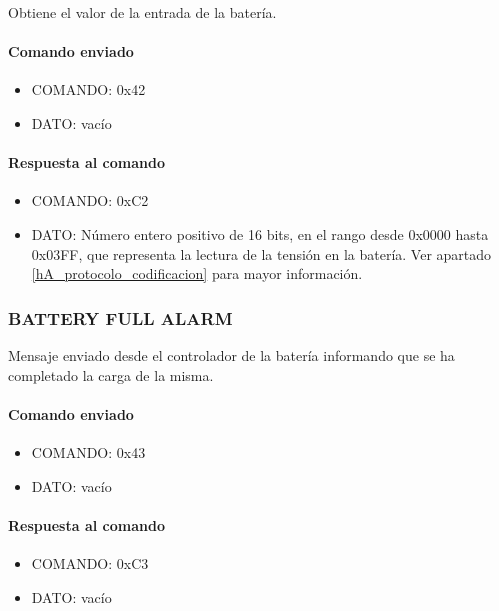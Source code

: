 Obtiene el valor de la entrada de la bater\'ia.

\paragraph*{Comando enviado}

\begin{itemize}
	\item{COMANDO:} 0x42
	\item{DATO:} vac\'io
\end{itemize}

\paragraph*{Respuesta al comando}

\begin{itemize}
	\item{COMANDO:} 0xC2
	\item{DATO:} N\'umero entero positivo de 16 bits, en el rango desde 0x0000 hasta 0x03FF, que representa la lectura de la tensi\'on en la bater\'ia.
		Ver apartado \ref{hA_protocolo_codificacion} para mayor informaci\'on.

\end{itemize}

\subsubsection{BATTERY FULL ALARM}
\label{hA_protocolo_battery_full_alarm}

Mensaje enviado desde el controlador de la bater\'ia informando que se ha completado la carga de la misma.

\paragraph*{Comando enviado}

\begin{itemize}
	\item{COMANDO:} 0x43
	\item{DATO:} vac\'io
\end{itemize}

\paragraph*{Respuesta al comando}

\begin{itemize}
	\item{COMANDO:} 0xC3
	\item{DATO:} vac\'io
\end{itemize}

